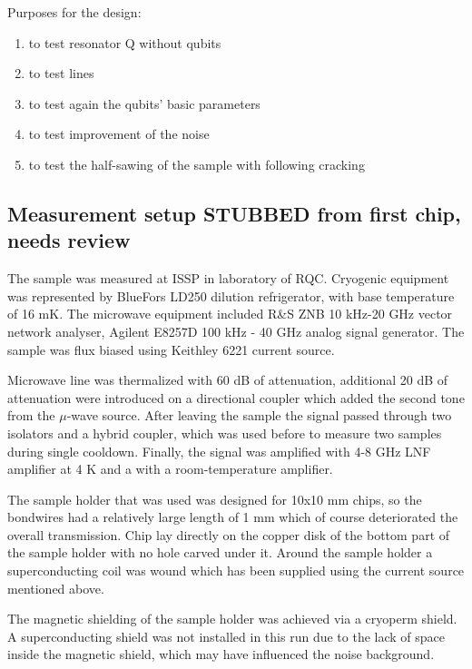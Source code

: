 Purposes for the design:
\begin{enumerate}[label=(\alph*), leftmargin=1.5cm]
\itemsep0pt
\item to test resonator Q without qubits

\item to test lines

\item to test again the qubits' basic parameters

\item to test improvement of the noise

\item to test the half-sawing of the sample with following cracking
\end{enumerate}

\subsection{Measurement setup  STUBBED from first chip, needs review}

The sample was measured at ISSP in laboratory of RQC. Cryogenic equipment was represented by BlueFors LD250 dilution refrigerator, with base temperature of 16 mK. The microwave equipment included R\&S ZNB 10 kHz-20 GHz vector network analyser,  Agilent E8257D 100 kHz - 40 GHz analog signal generator. The sample was flux biased using Keithley 6221 current source.

Microwave line was thermalized with 60 dB of attenuation, additional 20 dB of attenuation were introduced on a directional coupler which added the second tone from the $\mu$-wave source. After leaving the sample the signal passed through two isolators and a hybrid coupler, which was used before to measure two samples during single cooldown. Finally, the signal was amplified with 4-8 GHz LNF amplifier at 4 K and a with a room-temperature amplifier.

The sample holder that was used was designed for 10x10 mm chips, so the bondwires had a relatively large length of 1 mm which of course deteriorated the overall transmission. Chip lay directly on the copper disk of the bottom part of the sample holder with no hole carved under it. Around the sample holder a superconducting coil was wound which has been supplied using the current source mentioned above.

The magnetic shielding of the sample holder was achieved via a cryoperm shield. A superconducting shield was not installed in this run due to the lack of space inside the magnetic shield, which may have influenced the noise background.


